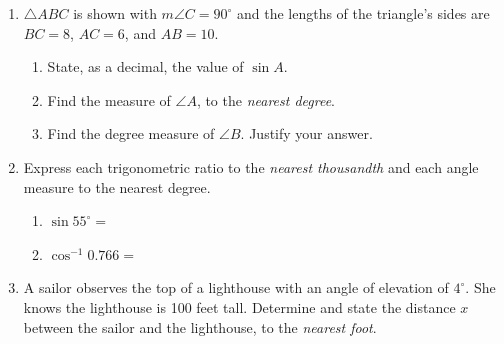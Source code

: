\documentclass[12pt, twoside]{article}
\begin{document}
\begin{enumerate}
  \item $\triangle ABC$ is shown with $m\angle C=90^\circ$ and the lengths of the triangle's sides are $BC=8$, $AC=6$, and $AB=10$.
  \begin{multicols}{2}
        \begin{enumerate}
        \item State, as a decimal, the value of $\sin A$. \vspace{0.75cm}
        \item Find the measure of $\angle A$, to the \emph{nearest degree}. \vspace{0.75cm}
        \item Find the degree measure of $\angle B$. Justify your answer.
      \end{enumerate}
    \end{multicols}
    \vspace{1.25cm}

  \item Express each trigonometric ratio to the \emph{nearest thousandth} and each angle measure to the nearest degree.
    \begin{multicols}{2}
      \begin{enumerate}
        \item $\sin 55^\circ =$ \vspace{0.5cm}
        \item $\cos^{-1} 0.766 =$ \vspace{0.5cm}
      \end{enumerate}
    \end{multicols} \vspace{0.25cm}

  \item A sailor observes the top of a lighthouse with an angle of elevation of $4^\circ$. She knows the lighthouse is 100 feet tall. Determine and state the distance $x$ between the sailor and the lighthouse, to the \emph{nearest foot}.\\[0.25cm]
     \vspace{3.25cm}


\end{enumerate}
\end{document}
